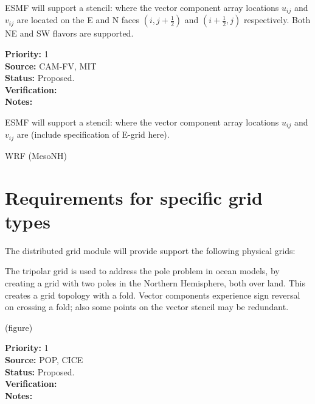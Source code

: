 \sreq{\dgrid}

ESMF will support a \dgrid stencil: where the vector component array
locations $u_{ij}$ and $v_{ij}$ are located on the E and N faces
$(i,j+\frac12)$ and $(i+\frac12,j)$ respectively. Both NE and SW
flavors are supported.

\begin{reqlist}
{\bf Priority:} 1 \\ 
{\bf Source:} CAM-FV, MIT \\
{\bf Status:} Proposed. \\
{\bf Verification:} \\
{\bf Notes:}
\end{reqlist}

\sreq{\egrid}

ESMF will support a \dgrid stencil: where the vector component array
locations $u_{ij}$ and $v_{ij}$ are (include specification of E-grid here).

\begin{reqlist}
\item[Priority]  
\item[Source]
WRF (MesoNH)
\item[Status]
\item[Verification]
\item[Notes]
\end{reqlist}

\part{Requirements for specific grid types} \label{DG:gridtypes}

The distributed grid module will provide support the following 
physical grids:


The tripolar grid \cite{ref:m1996} is used to address the pole problem
in ocean models, by creating a grid with two poles in the Northern
Hemisphere, both over land. This creates a grid topology with a
fold. Vector components experience sign reversal on crossing a fold;
also some points on the vector stencil may be redundant.

(figure)

\begin{reqlist}
{\bf Priority:} 1 \\ 
{\bf Source:} POP, CICE \\
{\bf Status:} Proposed. \\
{\bf Verification:} \\
{\bf Notes:}
\end{reqlist}

